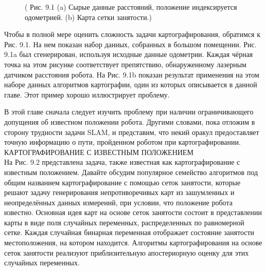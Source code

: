 \documentclass[10pt,a4paper]{article}
\begin{document}
\begin{figure}[H]
	\caption{ ( Рис. 9.1 (a) Сырые данные расстояний, положение индексируется одометрией. (b) Карта сетки занятости.)}
	\label{fig:91orig}
\end{figure} 

Чтобы в полной мере оценить сложность задачи картографирования, обратимся к Рис. 9.1. На нем показан набор данных, собранных в большом помещении. Рис. 9.1a был сгенерирован, используя исходные данные одометрии. Каждая чёрная точка на этом рисунке соответствует препятствию, обнаруженному лазерным датчиком расстояния робота. На Рис. 9.1b показан результат применения на этом наборе данных алгоритмов картографии, один из которых описывается в данной главе. Этот пример хорошо иллюстрирует проблему.

В этой главе сначала следует изучить проблему при наличии ограничивающего допущения об известном положении робота. Другими словами, пока отложим в сторону трудности задачи SLAM, и представим, что некий оракул предоставляет точную информацию о пути, пройденном роботом при картографировании.\\
КАРТОГРАФИРОВАНИЕ С ИЗВЕСТНЫМ ПОЛОЖЕНИЕМ\\ 
На Рис. 9.2 представлена задача, также известная как картографирование с известным положением.
Давайте обсудим популярное семейство алгоритмов под общим названием картографирование с помощью сеток занятости, которые решают задачу генерирования непротиворечивых карт из зашумленных и неопределённых данных измерений, при условии, что положение робота известно.  Основная идея карт на основе сеток занятости состоит в представлении карты в виде поля случайных переменных, распределенных по равномерной сетке. Каждая случайная бинарная переменная отображает состояние занятости местоположения, на котором находится. Алгоритмы картографирования на основе сеток занятости реализуют приблизительную апостериорную оценку для этих случайных переменных.
\end{document}
